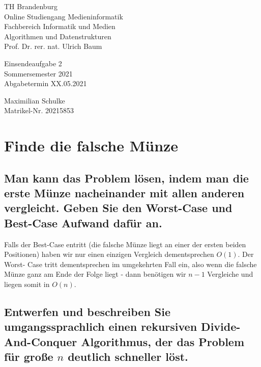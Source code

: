 \documentclass{article}
\begin{document}
\begin{titlepage}
	\begin{flushleft}
		TH Brandenburg \\
		Online Studiengang Medieninformatik \\
		Fachbereich Informatik und Medien \\
		Algorithmen und Datenstrukturen \\
		Prof. Dr. rer. nat. Ulrich Baum
	\end{flushleft}

	\vfill

	\begin{center}
		\Large{Einsendeaufgabe 2}\\[0.5em]
		\large{Sommersemester 2021}\\[0.25em]
		\large{Abgabetermin XX.05.2021}
	\end{center}

	\vfill

	\begin{flushright}
		Maximilian Schulke \\
		Matrikel-Nr. 20215853
	\end{flushright}
\end{titlepage}

\newpage

\section{Finde die falsche Münze}

\subsection{Man kann das Problem lösen, indem man die erste Münze nacheinander mit
allen anderen vergleicht. Geben Sie den Worst-Case und Best-Case Aufwand dafür an.}

Falls der Best-Case entritt (die falsche Münze liegt an einer der ersten beiden
Positionen) haben wir nur einen einzigen Vergleich dementsprechen $O(1)$. Der Worst-
Case tritt dementsprechen im umgekehrten Fall ein, also wenn die falsche Münze ganz
am Ende der Folge liegt - dann benötigen wir $n - 1$ Vergleiche und liegen somit in
$O(n)$.

\subsection{Entwerfen und beschreiben Sie umgangssprachlich einen rekursiven Divide-And-Conquer
Algorithmus, der das Problem für große $n$ deutlich schneller löst.}
\end{document}
